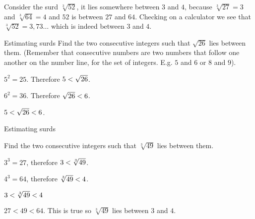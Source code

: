 


Consider the surd $\sqrt[3]{52}$, it lies somewhere between $3$ and $4$, because $\sqrt[3]{27}=3$ and $\sqrt[3]{64}=4$ and $52$ is between $27$ and $64$. Checking on a calculator we see that $\sqrt[3]{52}=3,73\ldots$ which is indeed between $3$ and $4$.\par 

\begin{wex}{Estimating surds}
{
Find the two consecutive integers such that $\sqrt{26}$ lies between them.
(Remember that consecutive numbers are two numbers that follow one another on the number line, for the set of integers. E.g. $5$ and $6$ or $8$ and $9$).
}
{
           
${5}^{2}=25$. Therefore $5<{}\sqrt{26}$.

${6}^{2}=36$. 
Therefore $\sqrt{26}<{}6$.

$5<{}\sqrt{26}<{}6$. 
}
\end{wex}


\begin{wex}{Estimating surds }{

Find the two consecutive integers such that $\sqrt[3]{49}$ lies between them.
}
{
   ${3}^{3}=27$, therefore $3<{}\sqrt[3]{49}$.

 ${4}^{3}=64$, therefore $\sqrt[3]{49}<{}4$. 

$3<{}\sqrt[3]{49}<{}4$

$27<49<64$. This is true so $\sqrt[3]{49}$ lies between $3$ and $4$.

}
\end{wex}

